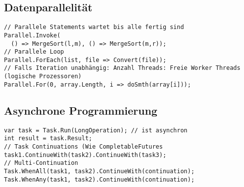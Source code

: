 \subsection{Datenparallelität}
\begin{lstlisting}
// Parallele Statements wartet bis alle fertig sind
Parallel.Invoke(
  () => MergeSort(l,m), () => MergeSort(m,r));
// Parallele Loop
Parallel.ForEach(list, file => Convert(file));
// Falls Iteration unabhängig: Anzahl Threads: Freie Worker Threads (logische Prozessoren)
Parallel.For(0, array.Length, i => doSmth(array[i]));
\end{lstlisting}
\subsection{Asynchrone Programmierung}
\begin{lstlisting}
var task = Task.Run(LongOperation); // ist asynchron
int result = task.Result;
// Task Continuations (Wie CompletableFutures
task1.ContinueWith(task2).ContinueWith(task3);
// Multi-Continuation
Task.WhenAll(task1, task2).ContinueWith(continuation);
Task.WhenAny(task1, task2).ContinueWith(continuation);
\end{lstlisting}